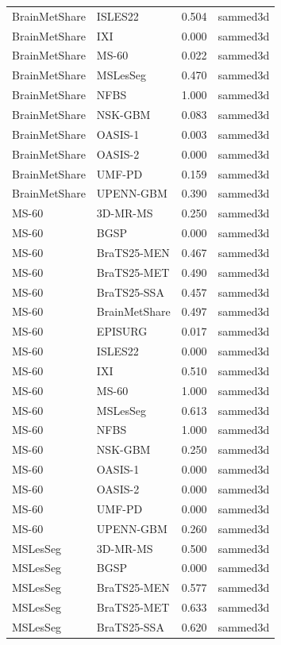 \begin{tabular}{llrl}
BrainMetShare & ISLES22 & 0.504 & sammed3d \\
BrainMetShare & IXI & 0.000 & sammed3d \\
BrainMetShare & MS-60 & 0.022 & sammed3d \\
BrainMetShare & MSLesSeg & 0.470 & sammed3d \\
BrainMetShare & NFBS & 1.000 & sammed3d \\
BrainMetShare & NSK-GBM & 0.083 & sammed3d \\
BrainMetShare & OASIS-1 & 0.003 & sammed3d \\
BrainMetShare & OASIS-2 & 0.000 & sammed3d \\
BrainMetShare & UMF-PD & 0.159 & sammed3d \\
BrainMetShare & UPENN-GBM & 0.390 & sammed3d \\
MS-60 & 3D-MR-MS & 0.250 & sammed3d \\
MS-60 & BGSP & 0.000 & sammed3d \\
MS-60 & BraTS25-MEN & 0.467 & sammed3d \\
MS-60 & BraTS25-MET & 0.490 & sammed3d \\
MS-60 & BraTS25-SSA & 0.457 & sammed3d \\
MS-60 & BrainMetShare & 0.497 & sammed3d \\
MS-60 & EPISURG & 0.017 & sammed3d \\
MS-60 & ISLES22 & 0.000 & sammed3d \\
MS-60 & IXI & 0.510 & sammed3d \\
MS-60 & MS-60 & 1.000 & sammed3d \\
MS-60 & MSLesSeg & 0.613 & sammed3d \\
MS-60 & NFBS & 1.000 & sammed3d \\
MS-60 & NSK-GBM & 0.250 & sammed3d \\
MS-60 & OASIS-1 & 0.000 & sammed3d \\
MS-60 & OASIS-2 & 0.000 & sammed3d \\
MS-60 & UMF-PD & 0.000 & sammed3d \\
MS-60 & UPENN-GBM & 0.260 & sammed3d \\
MSLesSeg & 3D-MR-MS & 0.500 & sammed3d \\
MSLesSeg & BGSP & 0.000 & sammed3d \\
MSLesSeg & BraTS25-MEN & 0.577 & sammed3d \\
MSLesSeg & BraTS25-MET & 0.633 & sammed3d \\
MSLesSeg & BraTS25-SSA & 0.620 & sammed3d \\

\end{tabular}
